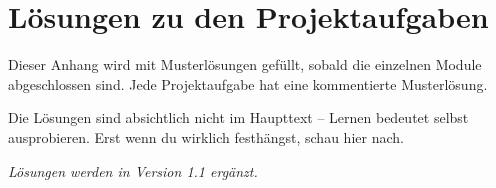 \chapter{Lösungen zu den Projektaufgaben}

Dieser Anhang wird mit Musterlösungen gefüllt, sobald die einzelnen Module abgeschlossen sind. Jede Projektaufgabe hat eine kommentierte Musterlösung.

Die Lösungen sind absichtlich nicht im Haupttext -- Lernen bedeutet selbst ausprobieren. Erst wenn du wirklich festhängst, schau hier nach.

\bigskip
\textit{Lösungen werden in Version 1.1 ergänzt.}

